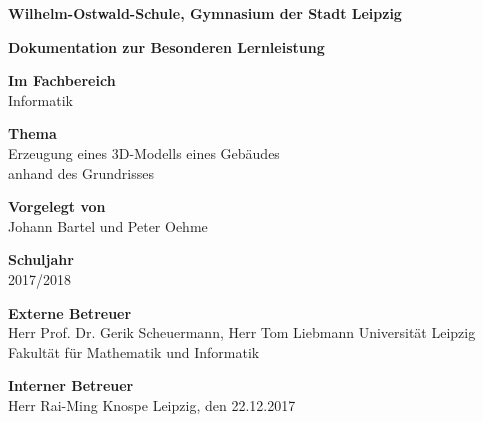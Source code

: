 \begin{center}
	\thispagestyle{empty}
			\textbf{Wilhelm-Ostwald-Schule, Gymnasium der Stadt Leipzig}
			
			\Large
			\textbf{Dokumentation zur Besonderen Lernleistung} \break
			
			\large
			\textbf{Im Fachbereich}\\
			Informatik \break
			
			
			\textbf{Thema}\\
			Erzeugung eines 3D-Modells eines Gebäudes\\ anhand des Grundrisses \break
			
			\textbf{Vorgelegt von}\\
			Johann Bartel und Peter Oehme \break
			
			\textbf{Schuljahr}\\
			2017/2018 \break
			
			\textbf{Externe Betreuer}\\
			Herr Prof. Dr. Gerik Scheuermann, Herr Tom Liebmann \break
			Universität Leipzig
			Fakultät für Mathematik und Informatik \break
			
			\textbf{Interner Betreuer}\\
			Herr Rai-Ming Knospe\break \break
			Leipzig, den 22.12.2017
			
	 
			
\end{center}
